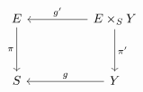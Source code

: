 \[
\begin{tikzcd}[column sep=4.8em, row sep=3.4em]
 E \arrow[d,"\pi"']
 &
 E\times_S Y \arrow[l,"g'"'] \arrow[d,"\pi'"]
 \\
 S
 &
 Y \arrow[l,"g"']
\end{tikzcd}
\]
